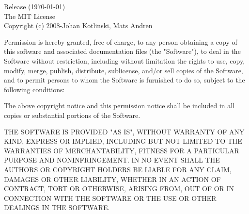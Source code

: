 

\setlength{\parindent}{0pt}

Release \texttt{\releasetag}\space (\today)\\[18pt]

The MIT License\\

Copyright (c) 2008-\the\year \space Johan Kotlinski, Mats Andren

\begin{flushleft}
Permission is hereby granted, free of charge, to any person obtaining a copy
of this software and associated documentation files (the "Software"), to deal
in the Software without restriction, including without limitation the rights
to use, copy, modify, merge, publish, distribute, sublicense, and/or sell
copies of the Software, and to permit persons to whom the Software is
furnished to do so, subject to the following conditions:
\end{flushleft}

\begin{flushleft}
The above copyright notice and this permission notice shall be included in
all copies or substantial portions of the Software.
\end{flushleft}

\begin{flushleft}
THE SOFTWARE IS PROVIDED "AS IS", WITHOUT WARRANTY OF ANY KIND, EXPRESS OR
IMPLIED, INCLUDING BUT NOT LIMITED TO THE WARRANTIES OF MERCHANTABILITY,
FITNESS FOR A PARTICULAR PURPOSE AND NONINFRINGEMENT. IN NO EVENT SHALL THE
AUTHORS OR COPYRIGHT HOLDERS BE LIABLE FOR ANY CLAIM, DAMAGES OR OTHER
LIABILITY, WHETHER IN AN ACTION OF CONTRACT, TORT OR OTHERWISE, ARISING FROM,
OUT OF OR IN CONNECTION WITH THE SOFTWARE OR THE USE OR OTHER DEALINGS IN
THE SOFTWARE.
\end{flushleft}

